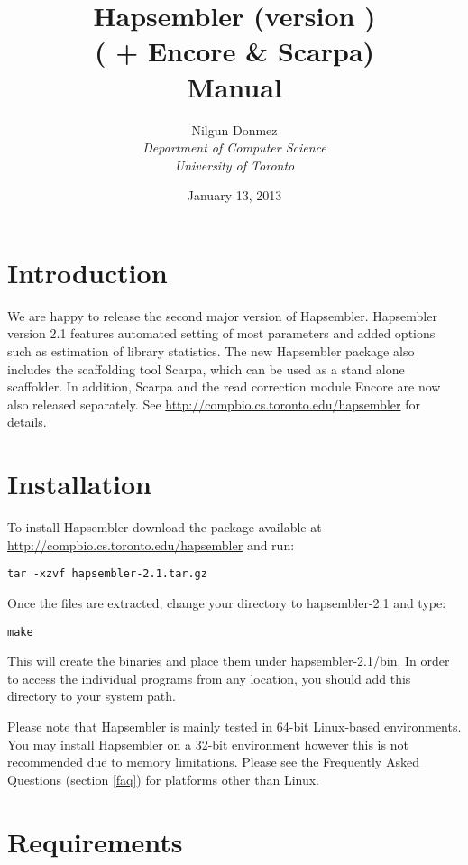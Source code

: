 \documentclass[12pt,a4paper]{report}
\title{Hapsembler (version \hapversion{}) \\ ( + Encore \& Scarpa) \\ Manual }
\author{Nilgun Donmez \\
\emph{Department of Computer Science} \\
\emph{University of Toronto} }
\date{January 13, 2013}
\newcommand{\hapversion}{2.1}
\begin{document}
\maketitle
\tableofcontents
\newpage

\renewcommand*\thesection{\arabic{section}}

\section{Introduction}

We are happy to release the second major version of Hapsembler. Hapsembler version \hapversion{} features automated setting of most parameters and added options such as estimation of library statistics. The new Hapsembler package also includes the scaffolding tool Scarpa, which can be used as a stand alone scaffolder. In addition, Scarpa and the read correction module Encore are now also released separately. See \url{http://compbio.cs.toronto.edu/hapsembler} for details. 

\section{Installation}

To install Hapsembler download the package available at \url{http://compbio.cs.toronto.edu/hapsembler} and run:

\begin{verbatim}
tar -xzvf hapsembler-2.1.tar.gz
\end{verbatim}

Once the files are extracted, change your directory to hapsembler-\hapversion{} and type:

\begin{verbatim}
make
\end{verbatim}

This will create the binaries and place them under hapsembler-\hapversion{}/bin. In order to access the individual programs from any location, you should add this directory to your system path. 

Please note that Hapsembler is mainly tested in 64-bit Linux-based environments. You may install Hapsembler on a 32-bit environment however this is not recommended due to memory limitations. Please see the Frequently Asked Questions (section \ref{faq}) for platforms other than Linux.

\section{Requirements}
\end{document}
